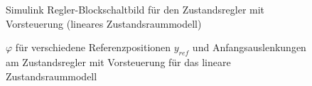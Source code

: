 \documentclass[
	pagesize,
	fontsize=12pt,
	paper=a4,
	oneside,
   reqno
]{scrartcl}
\begin{document}
\begin{figure}[H]
    \centering
    \caption[Regler mit Vorsteuerung Simulink (linear)]{Simulink Regler-Blockschaltbild für den Zustandsregler mit Vorsteuerung (lineares Zustandsraummodell)}
    \label{fig:Bild14.5}
\end{figure}

\begin{figure}[H]
    \centering
    \caption[$\varphi$ für Regler mit Vorsteuerung (linear)]{$\varphi$ für verschiedene Referenzpositionen $y_{ref}$ und Anfangsauslenkungen am Zustandsregler mit Vorsteuerung für das lineare Zustandsraummodell}
    \label{fig:Bild15}
\end{figure}
\end{document}
